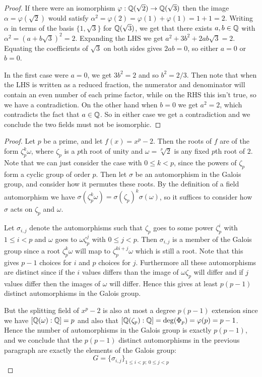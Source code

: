 \documentclass[11pt]{article}
\begin{document}
\begin{proof}
  If there were an isomorphism $\varphi: \mathbb{Q}(\sqrt{2}) \rightarrow \mathbb{Q}(\sqrt{3})$ then the image $\alpha = \varphi(\sqrt{2})$ would satisfy $\alpha^2 = \varphi(2) = \varphi(1) + \varphi(1) = 1 + 1 = 2$.
  Writing $\alpha$ in terms of the basis $\{1, \sqrt{3}\}$ for $\mathbb{Q}(\sqrt{3})$, we get that there exists $a,b \in \mathbb{Q}$ with $\alpha^2 = (a + b\sqrt{3})^2 = 2$. Expanding the LHS we get $a^2 + 3b^2 + 2ab\sqrt{3} = 2$. Equating the coefficients of $\sqrt{3}$ on both sides gives $2ab = 0$, so either $a = 0$ or $b = 0$.

  In the first case were $a = 0$, we get $3b^2 = 2$ and so $b^2 = 2/3$.
  Then note that when the LHS is written as a reduced fraction, the numerator and denominator will contain an even number of each prime factor, while on the RHS this isn't true, so we have a contradiction.
  On the other hand when $b = 0$ we get $a^2 = 2$, which contradicts the fact that $a \in \mathbb{Q}$. So in either case we get a contradiction and we conclude the two fields must not be isomorphic.
\end{proof}


\begin{proof}
  Let $p$ be a prime, and let $f(x) = x^p - 2$.
  Then the roots of $f$ are of the form $\zeta_p^k\omega$, where $\zeta_p$ is a $p$th root of unity and $\omega = \sqrt[p]{2}$ is any fixed $p$th root of $2$.
  Note that we can just consider the case with $0 \le k < p$, since the powers of $\zeta_p$ form a cyclic group of order $p$.
  Then let $\sigma$ be an automorphism in the Galois group, and consider how it permutes these roots.
  By the definition of a field automorphism we have $\sigma(\zeta_p^k\omega) = \sigma(\zeta_p)^k\sigma(\omega)$, so it suffices to consider how $\sigma$ acts on $\zeta_p$ and $\omega$.
  
  Let $\sigma_{i,j}$ denote the automorphisms such that $\zeta_p$ goes to some power $\zeta_p^i$ with $1 \le i < p$ and $\omega$ goes to $\omega\zeta_p^j$ with $0 \le j < p$.
  Then $\sigma_{i,j}$ is a member of the Galois group since a root $\zeta_p^k\omega$ will map to $\zeta_p^{ki + j}\omega$ which is still a root.
  Note that this gives $p-1$ choices for $i$ and $p$ choices for $j$.
  Furthermore all these automorphisms are distinct since if the $i$ values differs than the image of  $\omega\zeta_p$ will differ and if $j$ values differ then the images of $\omega$ will differ.
  Hence this gives at least $p(p-1)$ distinct automorphisms in the Galois group.
  
  But the splitting field of $x^p - 2$ is also at most a degree $p(p-1)$ extension since we have $[\mathbb{Q}(\omega):\mathbb{Q}] = p$ and also that $[\mathbb{Q}(\zeta_p):\mathbb{Q}] = \deg(\Phi_p) = \varphi(p) = p-1$.
  Hence the number of automorphisms in the Galois group is exactly $p(p-1)$, and we conclude that the $p(p-1)$ distinct automorphisms in the previous paragraph are exactly the elements of the Galois group:
  \begin{equation*}
    G = \{ \sigma_{i,j} \}_{1 \le i < p;\ 0 \le j < p}
  \end{equation*}
\end{proof}
\end{document}
